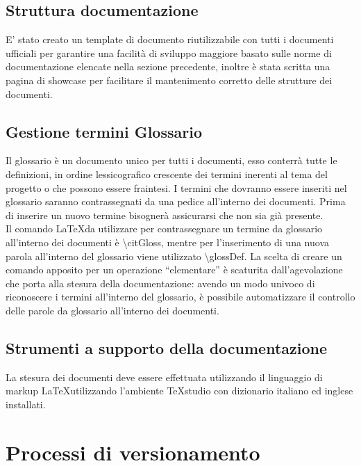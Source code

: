 \documentclass[NormeDiProgetto.tex]{subfiles}
\begin{document}
	\subsection{Struttura documentazione}
	E' stato creato un template di documento riutilizzabile con tutti i documenti ufficiali per garantire una facilità di sviluppo maggiore basato sulle norme di documentazione elencate nella sezione precedente, inoltre è stata scritta una pagina di showcase per facilitare il mantenimento corretto delle strutture dei documenti.
	
	\subsection{Gestione termini Glossario}
	Il glossario è un documento unico per tutti i documenti, esso conterrà tutte le definizioni, in ordine lessicografico crescente dei termini inerenti al tema del progetto o che possono essere fraintesi. I termini che dovranno essere inseriti nel glossario saranno contrassegnati da una \citGloss{} pedice all’interno dei documenti. Prima di inserire un nuovo termine bisognerà assicurarsi che non sia già presente. \\
	Il comando \LaTeX  da utilizzare per contrassegnare un termine da glossario all’interno dei documenti è \textbackslash citGloss, mentre per l’inserimento di una nuova parola all’interno del glossario viene utilizzato \textbackslash glossDef. %
	La scelta di creare un comando apposito per un operazione “elementare” è scaturita dall’agevolazione che porta alla stesura della documentazione: avendo un modo univoco di riconoscere i termini all’interno del glossario, è possibile automatizzare il controllo delle parole da glossario all’interno dei documenti.
	
	\subsection{Strumenti a supporto della documentazione} %
	La stesura dei documenti deve essere effettuata utilizzando il linguaggio di markup \LaTeX  utilizzando l'ambiente TeXstudio con dizionario italiano ed inglese installati.
	
	
	\section{Processi di versionamento}
	
\end{document}
